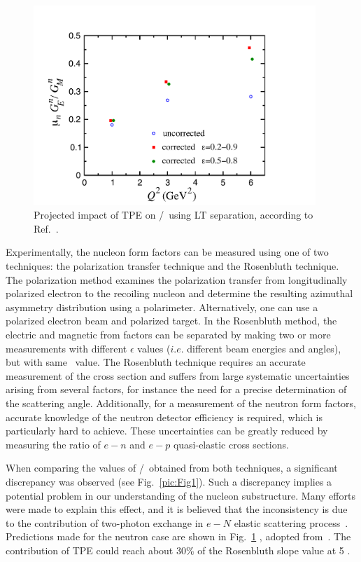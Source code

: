 \begin{figure}[th]
\includegraphics[width = 0.95\textwidth]{Plots/nTPE-BMT.pdf}
\caption{Projected impact of TPE on \gen/\gmn~using LT separation, according to Ref.~\cite{Blunden:2005ew}.}
\label{pic:Fig2}
\end{figure}
 
Experimentally, the nucleon form factors can be measured using one of two techniques: the polarization transfer technique and the Rosenbluth technique. 
The polarization method examines the polarization transfer from longitudinally polarized electron to the recoiling nucleon and 
determine the resulting azimuthal asymmetry distribution using a polarimeter. 
Alternatively, one can use a polarized electron beam and polarized target. 
In the Rosenbluth method, the electric and magnetic from factors can be separated by making two or more measurements with 
different $\epsilon$ values ($i.e.$ different beam energies and angles), but with same \qsq~value. 
The Rosenbluth technique requires an accurate measurement of the cross section and suffers from large systematic uncertainties arising from several factors, for instance
the need for a precise determination of the scattering angle. Additionally,
for a measurement of the neutron form factors, accurate knowledge of
the neutron detector efficiency is required, which is particularly hard to
achieve.
These uncertainties can be greatly reduced by measuring the ratio of $e-n$ and $e-p$ quasi-elastic cross sections.

When comparing the values of \gep/\gmp~obtained from both techniques, a significant discrepancy was observed (see Fig.~\ref{pic:Fig1}). 
Such a discrepancy implies a potential problem in our understanding of the nucleon substructure. 
Many efforts were made to explain this effect, and it is believed that the inconsistency is due to the contribution of two-photon exchange
in $e-N$ elastic scattering process~\cite{Arrington:2011dn, Afanasev:2017gsk}.
Predictions made for the neutron case are shown in Fig.~\ref{pic:Fig2}
, adopted from~\cite{Blunden:2005ew}.
The contribution of TPE could reach about 30\% of the Rosenbluth slope value at 5 \gevcsq.

